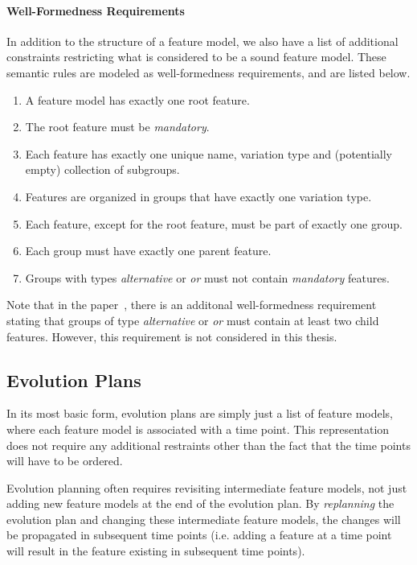 \documentclass[a4paper,english]{ifimaster}
\begin{document}
\paragraph{Well-Formedness Requirements}%
\label{par:well_formedness_requirements}

In addition to the structure of a feature model, we also have a list of additional constraints restricting what is considered to be a sound feature model. These semantic rules are modeled as well-formedness requirements, and are listed below.

\begin{enumerate}[\textit{\textbf{WF\arabic*}}, itemsep=0mm]
  \item A feature model has exactly one root feature.
  \item The root feature must be \textit{mandatory}.
  \item Each feature has exactly one unique name, variation type and (potentially empty) collection of subgroups.
  \item Features are organized in groups that have exactly one variation type.
  \item Each feature, except for the root feature, must be part of exactly one group.
  \item Each group must have exactly one parent feature.
  \item Groups with types \textit{alternative} or \textit{or} must not contain \textit{mandatory} features.
\end{enumerate}

Note that in the paper~\cite{cite:consistency_preserving_evolution_planning}, there is an additonal well-formedness requirement stating that groups of type \textit{alternative} or \textit{or} must contain at least two child features. However, this requirement is not considered in this thesis.

\subsection{Evolution Plans}%
\label{sub:evolution_plans}

In its most basic form, evolution plans are simply just a list of feature models, where each feature model is associated with a time point. This representation does not require any additional restraints other than the fact that the time points will have to be ordered.

Evolution planning often requires revisiting intermediate feature models, not just adding new feature models at the end of the evolution plan. By \textit{replanning} the evolution plan and changing these intermediate feature models, the changes will be propagated in subsequent time points (i.e. adding a feature at a time point will result in the feature existing in subsequent time points).
\end{document}
